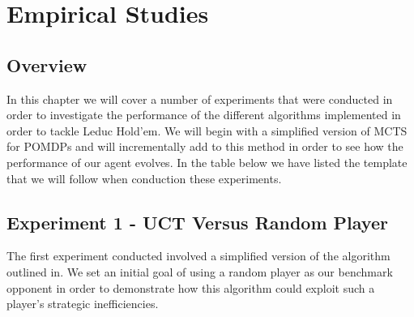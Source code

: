 
\chapter{Empirical Studies}\label{ch:empirical}

\section{Overview}\label{sec:empOverview}
In this chapter we will cover a number of experiments that were conducted in order to investigate
the performance of the different algorithms implemented in order to tackle Leduc Hold'em.
We will begin with a simplified version of MCTS for POMDPs and will incrementally add to this
method in order to see how the performance of our agent evolves.
In the table below we have listed the template that we will follow when conduction these experiments.



\section{Experiment 1 - UCT Versus Random Player}\label{sec:expmeriment1}
The first experiment conducted involved a simplified version of the algorithm outlined in\citep{heinrich2017reinforcement}.
We set an initial goal of using a random player as our benchmark opponent in order to demonstrate how
this algorithm could exploit such a player's strategic inefficiencies.

